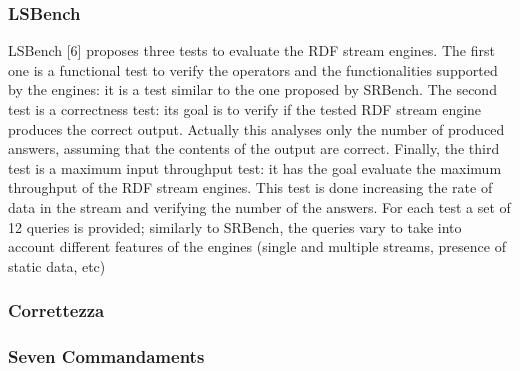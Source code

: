\subsubsection{LSBench}
LSBench [6] proposes three tests to evaluate the RDF stream engines. The
first one is a functional test to verify the operators and the functionalities supported
by the engines: it is a test similar to the one proposed by SRBench. The
second test is a correctness test: its goal is to verify if the tested RDF stream
engine produces the correct output. Actually this analyses only the number of
produced answers, assuming that the contents of the output are correct. Finally,
the third test is a maximum input throughput test: it has the goal evaluate the
maximum throughput of the RDF stream engines. This test is done increasing
the rate of data in the stream and verifying the number of the answers. For each
test a set of 12 queries is provided; similarly to SRBench, the queries vary to
take into account different features of the engines (single and multiple streams,
presence of static data, etc)

\subsubsection{Correttezza}
\subsubsection{Seven Commandaments}

